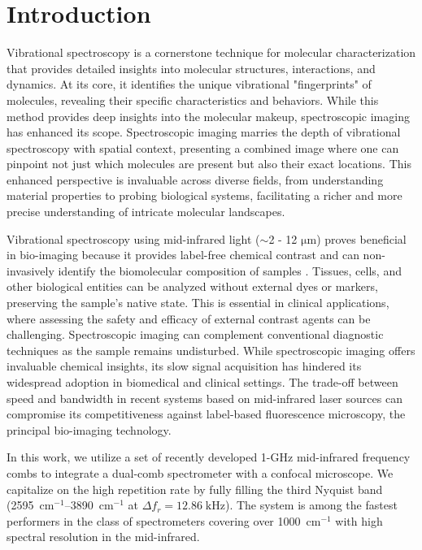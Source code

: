 \documentclass{optica-article}
\begin{document}
\section{Introduction}
Vibrational spectroscopy is a cornerstone technique for molecular characterization that provides detailed insights into molecular structures, interactions, and dynamics. At its core, it identifies the unique vibrational "fingerprints" of molecules, revealing their specific characteristics and behaviors. While this method provides deep insights into the molecular makeup, spectroscopic imaging has enhanced its scope. Spectroscopic imaging marries the depth of vibrational spectroscopy with spatial context, presenting a combined image where one can pinpoint not just which molecules are present but also their exact locations. This enhanced perspective is invaluable across diverse fields, from understanding material properties to probing biological systems, facilitating a richer and more precise understanding of intricate molecular landscapes.

Vibrational spectroscopy using mid-infrared light ($\sim$2 - 12 $\mathrm{\mu m}$) proves beneficial in bio-imaging because it provides label-free chemical contrast and can non-invasively identify the biomolecular composition of samples \cite{bakerUsingFourierTransform2014}. Tissues, cells, and other biological entities can be analyzed without external dyes or markers, preserving the sample's native state. This is essential in clinical applications, where assessing the safety and efficacy of external contrast agents can be challenging. Spectroscopic imaging can complement conventional diagnostic techniques as the sample remains undisturbed. While spectroscopic imaging offers invaluable chemical insights, its slow signal acquisition has hindered its widespread adoption in biomedical and clinical settings. The trade-off between speed and bandwidth in recent systems \cite{zhangDepthresolvedMidinfraredPhotothermal2016,koleDiscreteFrequencyInfrared2012,yehFastInfraredChemical2015}  based on mid-infrared laser sources can compromise its competitiveness against label-based fluorescence microscopy, the principal bio-imaging technology.

In this work, we utilize a set of recently developed 1-GHz mid-infrared frequency combs \cite{hoghooghiBroadband1GHzMidinfrared2022} to integrate a dual-comb spectrometer with a confocal microscope. We capitalize on the high repetition rate by fully filling the third Nyquist band (\mbox{2595 $\mathrm{cm^{-1}}$}--\mbox{3890 $\mathrm{cm^{-1}}$} at \mbox{$\Delta f_r=12.86 \; \text{kHz}$}). The system is among the fastest performers in the class of spectrometers covering over \mbox{1000 $\mathrm{cm^{-1}}$} with high spectral resolution in the mid-infrared.
\end{document}
